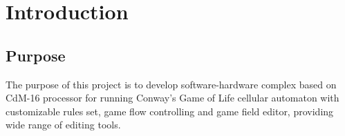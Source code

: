 \chapter*{Introduction}

\section*{Purpose}

The purpose of this project is to develop software-hardware complex based on CdM-16 processor for running Conway's Game of Life cellular automaton with customizable rules set, game flow controlling and game field editor, providing wide range of editing tools.
